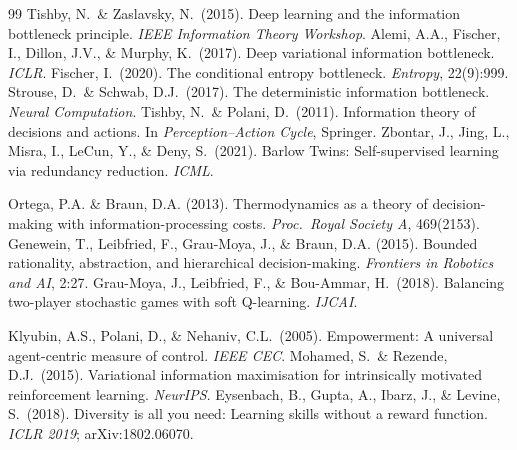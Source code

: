 \documentclass[10pt, letterpaper]{article}
\begin{document}
\begin{thebibliography}{99}
 Tishby, N.\ \& Zaslavsky, N.\ (2015). Deep learning and the information bottleneck principle. \emph{IEEE Information Theory Workshop}.
 Alemi, A.A., Fischer, I., Dillon, J.V., \& Murphy, K.\ (2017). Deep variational information bottleneck. \emph{ICLR}.
 Fischer, I.\ (2020). The conditional entropy bottleneck. \emph{Entropy}, 22(9):999.
 Strouse, D.\ \& Schwab, D.J.\ (2017). The deterministic information bottleneck. \emph{Neural Computation}.
 Tishby, N.\ \& Polani, D.\ (2011). Information theory of decisions and actions. In \emph{Perception--Action Cycle}, Springer.
 Zbontar, J., Jing, L., Misra, I., LeCun, Y., \& Deny, S.\ (2021). Barlow Twins: Self-supervised learning via redundancy reduction. \emph{ICML}.

 Ortega, P.A. \& Braun, D.A. (2013). Thermodynamics as a theory of decision-making with information-processing costs. \emph{Proc.\ Royal Society A}, 469(2153).
 Genewein, T., Leibfried, F., Grau-Moya, J., \& Braun, D.A. (2015). Bounded rationality, abstraction, and hierarchical decision-making. \emph{Frontiers in Robotics and AI}, 2:27.
 Grau-Moya, J., Leibfried, F., \& Bou-Ammar, H.\ (2018). Balancing two-player stochastic games with soft Q-learning. \emph{IJCAI}.

 Klyubin, A.S., Polani, D., \& Nehaniv, C.L.\ (2005). Empowerment: A universal agent-centric measure of control. \emph{IEEE CEC}.
 Mohamed, S.\ \& Rezende, D.J.\ (2015). Variational information maximisation for intrinsically motivated reinforcement learning. \emph{NeurIPS}.
 Eysenbach, B., Gupta, A., Ibarz, J., \& Levine, S.\ (2018). Diversity is all you need: Learning skills without a reward function. \emph{ICLR 2019}; arXiv:1802.06070.


\end{thebibliography}
\end{document}
